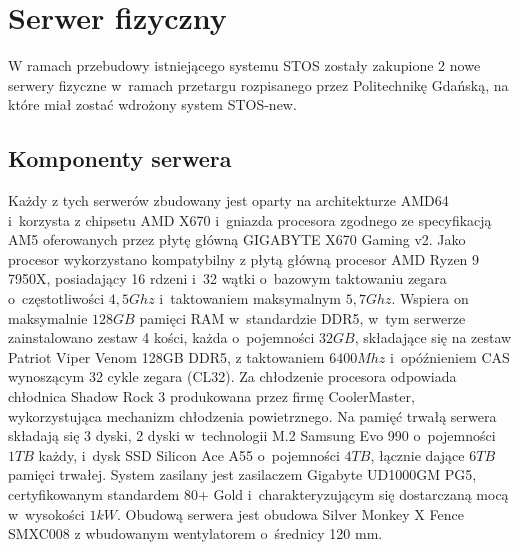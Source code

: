 \section{Serwer fizyczny}
W ramach przebudowy istniejącego systemu STOS zostały zakupione 2 nowe serwery fizyczne w~ramach przetargu rozpisanego przez Politechnikę Gdańską, na które miał zostać wdrożony system STOS-new.

\subsection{Komponenty serwera}
Każdy z tych serwerów zbudowany jest oparty na architekturze AMD64 i~korzysta z chipsetu AMD X670 i~gniazda procesora zgodnego ze specyfikacją AM5 oferowanych przez płytę główną GIGABYTE X670 Gaming v2\cite{gigabyteX670}. Jako procesor wykorzystano kompatybilny z płytą główną procesor AMD Ryzen 9 7950X, posiadający 16 rdzeni i~32 wątki o~bazowym taktowaniu zegara o~częstotliwości $4,5 Ghz$ i~taktowaniem maksymalnym $5,7 Ghz$\cite{ryzen}. Wspiera on maksymalnie $128 GB$ pamięci RAM w~standardzie DDR5, w~tym serwerze zainstalowano zestaw 4 kości, każda o~pojemności $32 GB$, składające się na zestaw Patriot Viper Venom 128GB DDR5, z taktowaniem $6400 Mhz$ i~opóźnieniem CAS wynoszącym 32 cykle zegara (CL32)\cite{patriotRam}. Za chłodzenie procesora odpowiada chłodnica Shadow Rock 3 produkowana przez firmę CoolerMaster, wykorzystująca mechanizm chłodzenia powietrznego\cite{coolermaster}. Na pamięć trwałą serwera składają się 3 dyski, 2 dyski w~technologii M.2 Samsung Evo 990 o~pojemności $1 TB$ każdy\cite{samsungSsd}, i~dysk SSD Silicon Ace A55\cite{sataSsd} o~pojemności $4 TB$, łącznie dające $6 TB$ pamięci trwałej. System zasilany jest zasilaczem Gigabyte UD1000GM PG5, certyfikowanym standardem 80+ Gold i~charakteryzującym się dostarczaną mocą w~wysokości $1 kW$\cite{zasilka}.  Obudową serwera jest obudowa Silver Monkey X Fence SMXC008 z wbudowanym wentylatorem o~średnicy 120 mm\cite{obudowa}.

